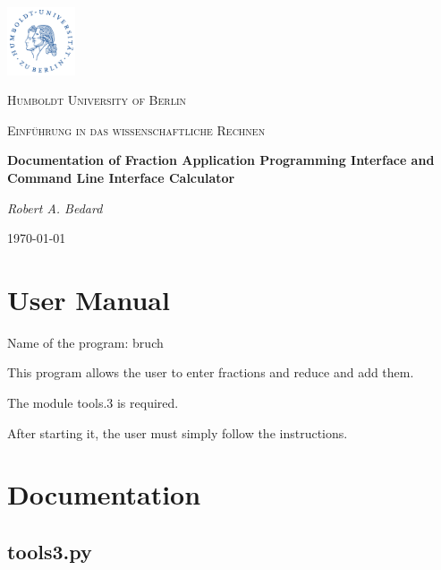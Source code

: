 \documentclass[refman]{scrartcl}
\begin{document}

\begin{titlepage}
	\centering
	\includegraphics[width=0.15\textwidth]{graphics/huberlin_logo}\par\vspace{1cm}
	{\scshape\LARGE Humboldt University of Berlin \par}
	\vspace{1cm}
	{\scshape\Large Einf{\"u}hrung in das wissenschaftliche Rechnen \par}
	\vspace{1.5cm}
	{\huge\bfseries Documentation of Fraction Application Programming Interface and Command Line Interface Calculator\par}
	\vspace{2cm}
	{\Large\itshape Robert A. Bedard \par}
	\vfill

	\vfill

	{\large \today\par}
\end{titlepage}

\tableofcontents
\newpage

\section{User Manual}
Name of the program: bruch

\noindent This program allows the user to enter fractions and reduce and add them.

\noindent The module tools.3 is required.

\noindent After starting it, the user must simply follow the instructions.
\section{Documentation}

\subsection{tools3.py}
\end{document}
